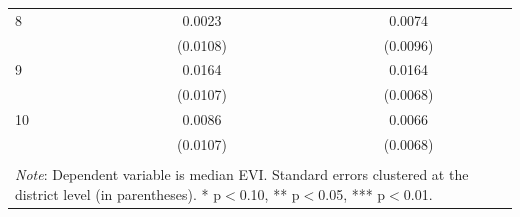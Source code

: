 \begin{tabular}{l*{2}{c}}
8                   &      0.0023         &      0.0074         \\
                    &    (0.0108)         &    (0.0096)         \\
9                   &      0.0164         &      0.0164\sym{**} \\
                    &    (0.0107)         &    (0.0068)         \\
10                  &      0.0086         &      0.0066         \\
                    &    (0.0107)         &    (0.0068)         \\
\hline \hline \\[-1.8ex] 
\multicolumn{3}{p{\linewidth}}{\small 
\noindent \textit{Note}: Dependent variable 
is median EVI. Standard errors clustered at the 
district level (in parentheses). 
* p$<$0.10, ** p$<$0.05, *** p$<$0.01.} 
\end{tabular}
